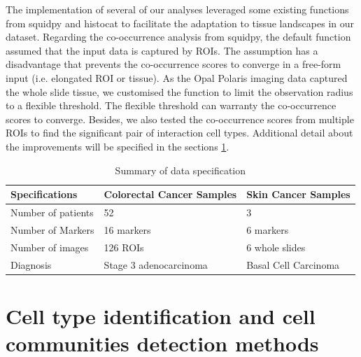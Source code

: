 The implementation of several of our analyses leveraged some existing functions from squidpy \cite{palla2022squidpy} and histocat \cite{schapiro2017histocat} to facilitate the adaptation to tissue landscapes in our dataset. Regarding the co-occurrence analysis from squidpy, the default function assumed that the input data is captured by ROIs. The assumption has a disadvantage that prevents the co-occurrence scores to converge in a free-form input (i.e. elongated ROI or tissue). As the Opal Polaris imaging data captured the whole slide tissue, we customised the function to limit the observation radius to a flexible threshold. The flexible threshold can warranty the co-occurrence scores to converge. Besides, we also tested the co-occurrence scores from multiple ROIs to find the significant pair of interaction cell types. Additional detail about the improvements will be specified in the sections \ref{Sec:3.2_SP_celltype_id_pipeline}.

\begin{table}[ht]
\centering
\caption{Summary of data specification}
\begin{tabular}{||P{7cm} || P{3cm} || P{3cm} ||} 
 \hline
 Specifications & Colorectal Cancer Samples & Skin Cancer Samples   \\ [0.33ex] 
 \hline\hline
 Number of patients & 52 & 3   \\ 
 \hline
 Number of Markers & 16 markers & 6 markers  \\ 
 \hline
 Number of images & 126 ROIs &  6 whole slides \\
 \hline
 Diagnosis & Stage 3 adenocarcinoma & Basal Cell Carcinoma  \\ [1ex] 
 \hline
\end{tabular}
\label{table:DataInfor}
\end{table}
\section{Cell type identification and cell communities detection methods}
\label{Sec:3.2_SP_celltype_id_pipeline}	%
